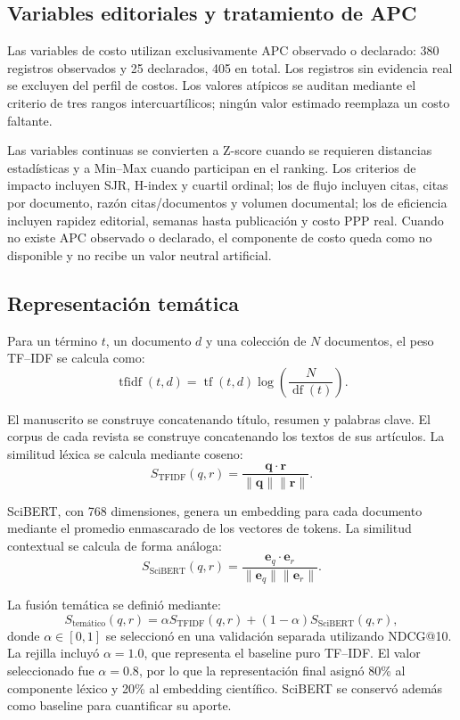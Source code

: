 \documentclass[12pt,a4paper]{article}
\begin{document}
\subsection{Variables editoriales y tratamiento de APC}
Las variables de costo utilizan exclusivamente APC observado o declarado: 380 registros observados y 25 declarados, 405 en total. Los registros sin evidencia real se excluyen del perfil de costos. Los valores atípicos se auditan mediante el criterio de tres rangos intercuartílicos; ningún valor estimado reemplaza un costo faltante.

Las variables continuas se convierten a Z-score cuando se requieren distancias estadísticas y a Min--Max cuando participan en el ranking. Los criterios de impacto incluyen SJR, H-index y cuartil ordinal; los de flujo incluyen citas, citas por documento, razón citas/documentos y volumen documental; los de eficiencia incluyen rapidez editorial, semanas hasta publicación y costo PPP real. Cuando no existe APC observado o declarado, el componente de costo queda como no disponible y no recibe un valor neutral artificial.

\subsection{Representación temática}
Para un término $t$, un documento $d$ y una colección de $N$ documentos, el peso TF--IDF se calcula como:
\begin{equation}
\operatorname{tfidf}(t,d)=\operatorname{tf}(t,d)\log\left(\frac{N}{\operatorname{df}(t)}\right).
\end{equation}

El manuscrito se construye concatenando título, resumen y palabras clave. El corpus de cada revista se construye concatenando los textos de sus artículos. La similitud léxica se calcula mediante coseno:
\begin{equation}
S_{\mathrm{TFIDF}}(q,r)=\frac{\mathbf{q}\cdot\mathbf{r}}{\|\mathbf{q}\|\|\mathbf{r}\|}.
\end{equation}

SciBERT, con 768 dimensiones, genera un embedding para cada documento mediante el promedio enmascarado de los vectores de tokens. La similitud contextual se calcula de forma análoga:
\begin{equation}
S_{\mathrm{SciBERT}}(q,r)=\frac{\mathbf{e}_q\cdot\mathbf{e}_r}{\|\mathbf{e}_q\|\|\mathbf{e}_r\|}.
\end{equation}

La fusión temática se definió mediante:
\begin{equation}
S_{\text{temático}}(q,r)=\alpha S_{\mathrm{TFIDF}}(q,r)+(1-\alpha)S_{\mathrm{SciBERT}}(q,r),
\end{equation}
\noindent donde $\alpha\in[0,1]$ se seleccionó en una validación separada utilizando NDCG@10. La rejilla incluyó $\alpha=1.0$, que representa el baseline puro TF--IDF. El valor seleccionado fue $\alpha=0.8$, por lo que la representación final asignó 80\% al componente léxico y 20\% al embedding científico. SciBERT se conservó además como baseline para cuantificar su aporte.
\end{document}
